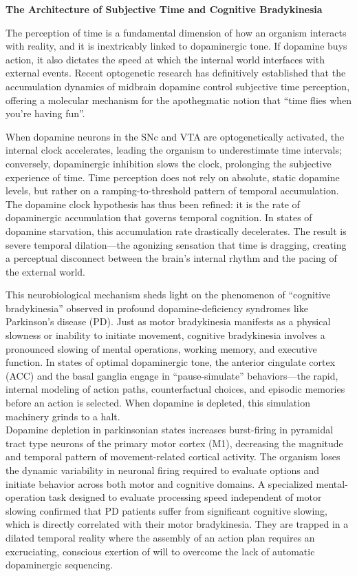 \textbf{The Architecture of Subjective Time and Cognitive Bradykinesia}

The perception of time is a fundamental dimension of how an organism interacts with reality, and it is inextricably linked to dopaminergic tone. If dopamine buys action, it also dictates the speed at which the internal world interfaces with external events. Recent optogenetic research has definitively established that the accumulation dynamics of midbrain dopamine control subjective time perception, offering a molecular mechanism for the apothegmatic notion that ``time flies when you're having fun''.

When dopamine neurons in the SNc and VTA are optogenetically activated, the internal clock accelerates, leading the organism to underestimate time intervals; conversely, dopaminergic inhibition slows the clock, prolonging the subjective experience of time. Time perception does not rely on absolute, static dopamine levels, but rather on a ramping-to-threshold pattern of temporal accumulation. The dopamine clock hypothesis has thus been refined: it is the rate of dopaminergic accumulation that governs temporal cognition. In states of dopamine starvation, this accumulation rate drastically decelerates. The result is severe temporal dilation---the agonizing sensation that time is dragging, creating a perceptual disconnect between the brain's internal rhythm and the pacing of the external world.

This neurobiological mechanism sheds light on the phenomenon of ``cognitive bradykinesia'' observed in profound dopamine-deficiency syndromes like Parkinson's disease (PD). Just as motor bradykinesia manifests as a physical slowness or inability to initiate movement, cognitive bradykinesia involves a pronounced slowing of mental operations, working memory, and executive function. In states of optimal dopaminergic tone, the anterior cingulate cortex (ACC) and the basal ganglia engage in ``pause-simulate'' behaviors---the rapid, internal modeling of action paths, counterfactual choices, and episodic memories before an action is selected. When dopamine is depleted, this simulation machinery grinds to a halt.\\
Dopamine depletion in parkinsonian states increases burst-firing in pyramidal tract type neurons of the primary motor cortex (M1), decreasing the magnitude and temporal pattern of movement-related cortical activity. The organism loses the dynamic variability in neuronal firing required to evaluate options and initiate behavior across both motor and cognitive domains. A specialized mental-operation task designed to evaluate processing speed independent of motor slowing confirmed that PD patients suffer from significant cognitive slowing, which is directly correlated with their motor bradykinesia. They are trapped in a dilated temporal reality where the assembly of an action plan requires an excruciating, conscious exertion of will to overcome the lack of automatic dopaminergic sequencing.

